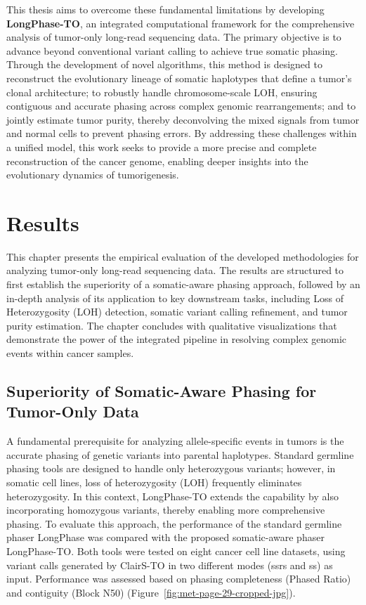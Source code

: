 \documentclass[pdflatex,sn-nature]{sn-jnl}
\begin{document}
This thesis aims to overcome these fundamental limitations by developing \textbf{LongPhase-TO}, an integrated computational framework for the comprehensive analysis of tumor-only long-read sequencing data. The primary objective is to advance beyond conventional variant calling to achieve true somatic phasing. Through the development of novel algorithms, this method is designed to reconstruct the evolutionary lineage of somatic haplotypes that define a tumor's clonal architecture; to robustly handle chromosome-scale LOH, ensuring contiguous and accurate phasing across complex genomic rearrangements; and to jointly estimate tumor purity, thereby deconvolving the mixed signals from tumor and normal cells to prevent phasing errors. By addressing these challenges within a unified model, this work seeks to provide a more precise and complete reconstruction of the cancer genome, enabling deeper insights into the evolutionary dynamics of tumorigenesis.

\section{Results}\label{results}

This chapter presents the empirical evaluation of the developed methodologies for analyzing tumor-only long-read sequencing data. The results are structured to first establish the superiority of a somatic-aware phasing approach, followed by an in-depth analysis of its application to key downstream tasks, including Loss of Heterozygosity (LOH) detection, somatic variant calling refinement, and tumor purity estimation. The chapter concludes with qualitative visualizations that demonstrate the power of the integrated pipeline in resolving complex genomic events within cancer samples.

\subsection{Superiority of Somatic-Aware Phasing for Tumor-Only Data}\label{superiority-of-somatic-aware-phasing-for-tumor-only-data}

A fundamental prerequisite for analyzing allele-specific events in tumors is the accurate phasing of genetic variants into parental haplotypes. Standard germline phasing tools are designed to handle only heterozygous variants; however, in somatic cell lines, loss of heterozygosity (LOH) frequently eliminates heterozygosity. In this context, LongPhase-TO extends the capability by also incorporating homozygous variants, thereby enabling more comprehensive phasing. To evaluate this approach, the performance of the standard germline phaser LongPhase was compared with the proposed somatic-aware phaser LongPhase-TO. Both tools were tested on eight cancer cell line datasets, using variant calls generated by ClairS-TO in two different modes (ssrs and ss) as input. Performance was assessed based on phasing completeness (Phased Ratio) and contiguity (Block N50) (Figure~\ref{fig:met-page-29-cropped-jpg}).
\end{document}
